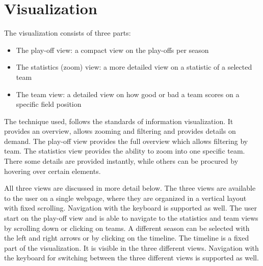 \documentclass[chi_draft]{sigchi}
\begin{document}



\section{Visualization}\label{sec:visualization}
The visualization consists of three parts:
\begin{itemize}
    \item The play-off view: a compact view on the play-offs per season
    \item The statistics (zoom) view: a more detailed view on a statistic of a
        selected team
    \item The team view: a detailed view on how good or bad a team scores on a
        specific field position
\end{itemize}

The technique used, follows the standards of information visualization. It provides
an overview, allows zooming and filtering and provides details on
demand\cite{mantra,multipleviews,automatingdesign}. The play-off view provides
the full overview which allows filtering by team. The statistics view provides
the ability to zoom into one specific team. There some details are provided
instantly, while others can be procured by hovering over certain elements.

All three views are discussed in more detail below. The three views are
available to the user on a single webpage, where they are organized in a 
vertical layout with fixed scrolling. Navigation with the keyboard is 
supported as well. The user start on the play-off view and is able to 
navigate to the statistics and team views by scrolling down or clicking 
on teams. A different season can be selected with the left and right
arrows or by clicking on the timeline. The timeline is a fixed part of the
visualization. It is visible in the three different views. Navigation 
with the keyboard for switching between the three different views is 
supported as well.
\end{document}

